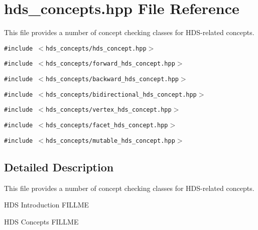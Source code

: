 \section{hds\_\-concepts.hpp File Reference}
\label{hds__concepts_8hpp}
This file provides a number of concept checking classes for HDS-related concepts. 

{\tt \#include $<$hds\_\-concepts/hds\_\-concept.hpp$>$}\par
{\tt \#include $<$hds\_\-concepts/forward\_\-hds\_\-concept.hpp$>$}\par
{\tt \#include $<$hds\_\-concepts/backward\_\-hds\_\-concept.hpp$>$}\par
{\tt \#include $<$hds\_\-concepts/bidirectional\_\-hds\_\-concept.hpp$>$}\par
{\tt \#include $<$hds\_\-concepts/vertex\_\-hds\_\-concept.hpp$>$}\par
{\tt \#include $<$hds\_\-concepts/facet\_\-hds\_\-concept.hpp$>$}\par
{\tt \#include $<$hds\_\-concepts/mutable\_\-hds\_\-concept.hpp$>$}\par


\subsection{Detailed Description}
This file provides a number of concept checking classes for HDS-related concepts. 

\begin{Desc}
\item[HDS Introduction]FILLME\end{Desc}
\begin{Desc}
\item[HDS Concepts]FILLME \end{Desc}

